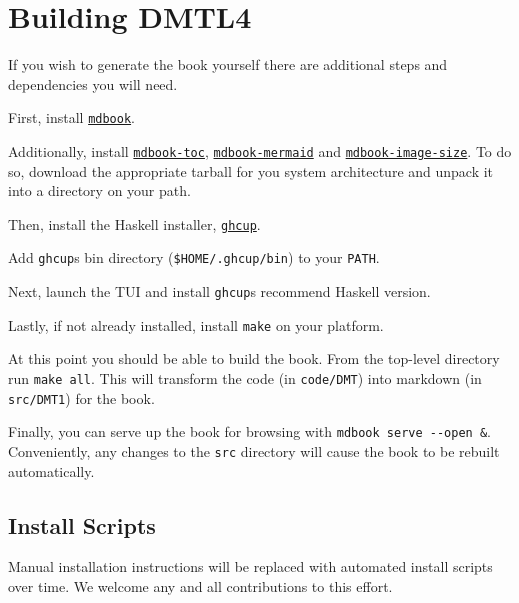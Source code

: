 \documentclass{book}
\begin{document}
\hypertarget{book__pandoc__debug__src__build.md__building-dmtl4}{%
\section*{Building DMTL4}\label{book__pandoc__debug__src__build.md__building-dmtl4}}

If you wish to generate the book yourself there are additional steps and
dependencies you will need.

First, install \href{https://github.com/rust-lang/mdBook/releases/tag/v0.4.43}{\texttt{mdbook}}.

Additionally, install \href{https://github.com/badboy/mdbook-toc/releases/tag/0.14.2}{\texttt{mdbook-toc}}, \href{https://github.com/badboy/mdbook-mermaid/releases/tag/v0.14.1}{\texttt{mdbook-mermaid}} and
\href{https://github.com/lhybdv/mdbook-image-size/releases/tag/0.2.0}{\texttt{mdbook-image-size}}. To do so, download the appropriate tarball for you
system architecture and unpack it into a directory on your path.

Then, install the Haskell installer, \href{https://www.haskell.org/ghcup/}{\texttt{ghcup}}.

Add \texttt{ghcup}\textquotesingle s bin directory (\texttt{\$HOME/.ghcup/bin}) to your \texttt{PATH}.

Next, launch the TUI and install \texttt{ghcup}\textquotesingle s recommend Haskell version.

Lastly, if not already installed, install \texttt{make} on your platform.

At this point you should be able to build the book. From the top-level
directory run \texttt{make\ all}. This will transform the code (in \texttt{code/DMT}) into
markdown (in \texttt{src/DMT1}) for the book.

Finally, you can serve up the book for browsing with \texttt{mdbook\ serve\ -\/-open\ \&}.
Conveniently, any changes to the \texttt{src} directory will cause the book to be
rebuilt automatically.

\hypertarget{book__pandoc__debug__src__build.md__install-scripts}{%
\subsection*{Install Scripts}\label{book__pandoc__debug__src__build.md__install-scripts}}

Manual installation instructions will be replaced with automated install
scripts over time. We welcome any and all contributions to this effort.
\end{document}
